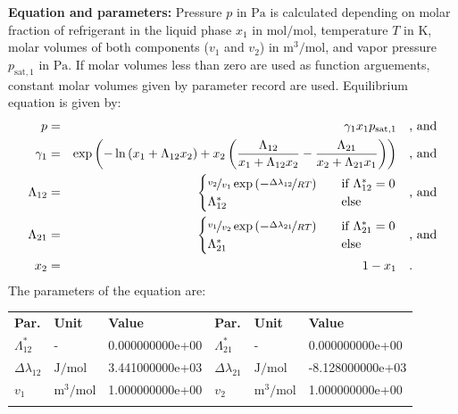 \textbf{Equation and parameters:}
\newline
%
Pressure $p$ in $\si{\pascal}$ is calculated depending on molar fraction of refrigerant in the liquid phase $x_1$ in $\si{\mole\per\mole}$, temperature $T$ in $\si{\kelvin}$, molar volumes of both components ($v_1$ and $v_2$) in $\si{\cubic\meter\per\mole}$, and vapor pressure $p_\mathrm{sat,1}$ in $\si{\pascal}$. If molar volumes less than zero are used as function arguements, constant molar volumes given by parameter record are used. Equilibrium equation is given by:
%
\begin{equation*}
\begin{split}
p &=& \gamma_1 x_1 p_\mathrm{sat,1} & \quad\text{, and} \\
\gamma_1 &=& \exp \left( - \ln \left( x_1 + \Lambda_{12} x_2 \right) + x_2 \left( \frac{\Lambda_{12}}{x_1 + \Lambda_{12} x_2} - \frac{\Lambda_{21}}{x_2 + \Lambda_{21} x_1} \right) \right) & \quad\text{, and} \\
\Lambda_{12} &=& \begin{cases} \nicefrac{v_2}{v_1} \exp \left( - \nicefrac{\Delta\lambda_{12}}{R T} \right) & \quad \text{if } \Lambda_{12}^{*} = 0 \\ \Lambda_{12}^{*}  & \quad \text{else} \end{cases}  & \quad\text{, and} \\
\Lambda_{21} &=& \begin{cases} \nicefrac{v_1}{v_2} \exp \left( - \nicefrac{\Delta\lambda_{21}}{R T} \right) & \quad \text{if } \Lambda_{21}^{*} = 0 \\ \Lambda_{21}^{*}  & \quad \text{else} \end{cases}  & \quad\text{, and} \\
x_2 &=& 1 - x_1  & \quad\text{.} \\
\end{split}
\end{equation*}
%
The parameters of the equation are:
%
\begin{longtable}[l]{lll|lll}
\toprule
\addlinespace
\textbf{Par.} & \textbf{Unit} & \textbf{Value} &	\textbf{Par.} & \textbf{Unit} & \textbf{Value} \\
\addlinespace
\midrule
\endhead

\bottomrule
\endfoot
\bottomrule
\endlastfoot
\addlinespace

$\Lambda_{12}^{*}$ & - & 0.000000000e+00 & $\Lambda_{21}^{*}$ & - & 0.000000000e+00 \\
$\Delta\lambda_{12}$ & $\si{\joule\per\mole}$ & 3.441000000e+03 & $\Delta\lambda_{21}$ & $\si{\joule\per\mole}$ & -8.128000000e+03 \\
$v_1$ & $\si{\cubic\meter\per\mole}$ & 1.000000000e+00 & $v_2$ & $\si{\cubic\meter\per\mole}$ & 1.000000000e+00 \\

\addlinespace\end{longtable}

